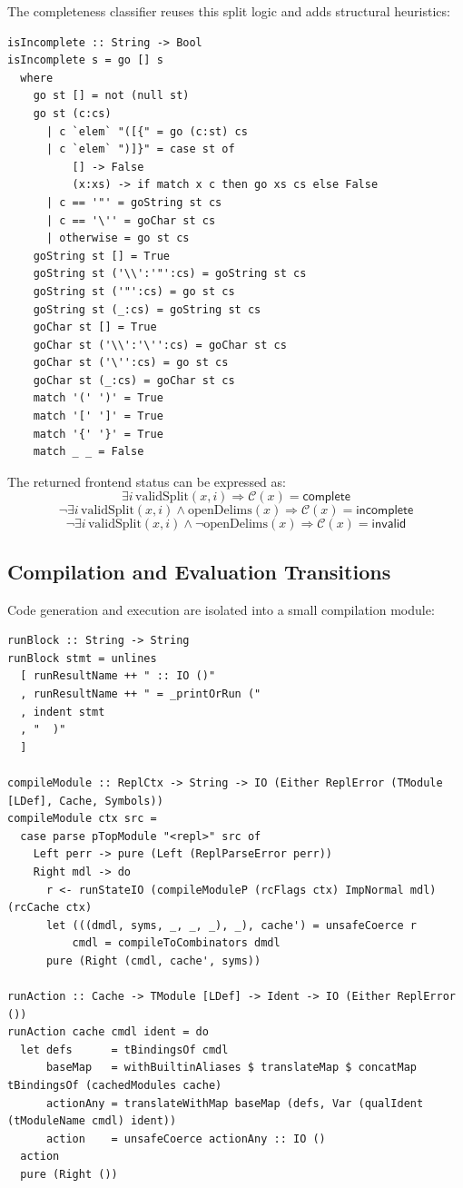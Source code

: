 The completeness classifier reuses this split logic and adds structural heuristics:

\begin{verbatim}
isIncomplete :: String -> Bool
isIncomplete s = go [] s
  where
    go st [] = not (null st)
    go st (c:cs)
      | c `elem` "([{" = go (c:st) cs
      | c `elem` ")]}" = case st of
          [] -> False
          (x:xs) -> if match x c then go xs cs else False
      | c == '"' = goString st cs
      | c == '\'' = goChar st cs
      | otherwise = go st cs
    goString st [] = True
    goString st ('\\':'"':cs) = goString st cs
    goString st ('"':cs) = go st cs
    goString st (_:cs) = goString st cs
    goChar st [] = True
    goChar st ('\\':'\'':cs) = goChar st cs
    goChar st ('\'':cs) = go st cs
    goChar st (_:cs) = goChar st cs
    match '(' ')' = True
    match '[' ']' = True
    match '{' '}' = True
    match _ _ = False
\end{verbatim}

The returned frontend status can be expressed as:
$$
\exists i\,\mathrm{validSplit}(x,i) \Rightarrow \mathcal{C}(x)=\mathsf{complete}
$$
$$
\neg\exists i\,\mathrm{validSplit}(x,i) \land \mathrm{openDelims}(x)
\Rightarrow \mathcal{C}(x)=\mathsf{incomplete}
$$
$$
\neg\exists i\,\mathrm{validSplit}(x,i) \land \neg\mathrm{openDelims}(x)
\Rightarrow \mathcal{C}(x)=\mathsf{invalid}
$$

\subsection{Compilation and Evaluation Transitions}

Code generation and execution are isolated into a small compilation module:

\begin{verbatim}
runBlock :: String -> String
runBlock stmt = unlines
  [ runResultName ++ " :: IO ()"
  , runResultName ++ " = _printOrRun ("
  , indent stmt
  , "  )"
  ]

compileModule :: ReplCtx -> String -> IO (Either ReplError (TModule [LDef], Cache, Symbols))
compileModule ctx src =
  case parse pTopModule "<repl>" src of
    Left perr -> pure (Left (ReplParseError perr))
    Right mdl -> do
      r <- runStateIO (compileModuleP (rcFlags ctx) ImpNormal mdl) (rcCache ctx)
      let (((dmdl, syms, _, _, _), _), cache') = unsafeCoerce r
          cmdl = compileToCombinators dmdl
      pure (Right (cmdl, cache', syms))

runAction :: Cache -> TModule [LDef] -> Ident -> IO (Either ReplError ())
runAction cache cmdl ident = do
  let defs      = tBindingsOf cmdl
      baseMap   = withBuiltinAliases $ translateMap $ concatMap tBindingsOf (cachedModules cache)
      actionAny = translateWithMap baseMap (defs, Var (qualIdent (tModuleName cmdl) ident))
      action    = unsafeCoerce actionAny :: IO ()
  action
  pure (Right ())
\end{verbatim}

